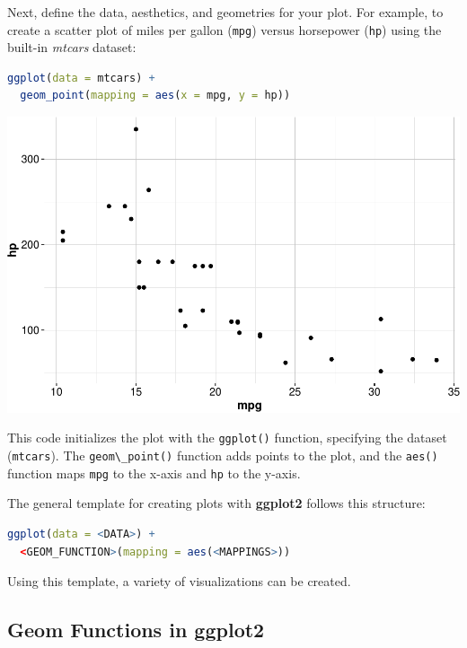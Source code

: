 \documentclass[
]{book}
\newcommand{\passthrough}[1]{#1}
\theoremstyle{definition}
\theoremstyle{definition}
\theoremstyle{definition}
\theoremstyle{definition}
\theoremstyle{remark}
\begin{document}
Next, define the data, aesthetics, and geometries for your plot. For example, to create a scatter plot of miles per gallon (\passthrough{\lstinline!mpg!}) versus horsepower (\passthrough{\lstinline!hp!}) using the built-in \emph{mtcars} dataset:

\begin{lstlisting}[language=R]
ggplot(data = mtcars) +
  geom_point(mapping = aes(x = mpg, y = hp))
\end{lstlisting}

\begin{center}\includegraphics{Intro-R_files/figure-latex/unnamed-chunk-32-1} \end{center}

This code initializes the plot with the \passthrough{\lstinline!ggplot()!} function, specifying the dataset (\passthrough{\lstinline!mtcars!}). The \passthrough{\lstinline!geom\_point()!} function adds points to the plot, and the \passthrough{\lstinline!aes()!} function maps \passthrough{\lstinline!mpg!} to the x-axis and \passthrough{\lstinline!hp!} to the y-axis.

The general template for creating plots with \textbf{ggplot2} follows this structure:

\begin{lstlisting}[language=R]
ggplot(data = <DATA>) +
  <GEOM_FUNCTION>(mapping = aes(<MAPPINGS>))
\end{lstlisting}

Using this template, a variety of visualizations can be created.

\subsection*{Geom Functions in ggplot2}\label{geom-functions-in-ggplot2}
\end{document}
